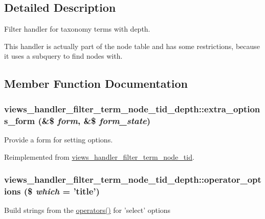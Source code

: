 \subsection{Detailed Description}
Filter handler for taxonomy terms with depth.

This handler is actually part of the node table and has some restrictions, because it uses a subquery to find nodes with. 

\subsection{Member Function Documentation}
\hypertarget{classviews__handler__filter__term__node__tid__depth_a704c5e42a5a41ee12bd01b1b153431e4}{
\subsubsection[{extra\_\-options\_\-form}]{\setlength{\rightskip}{0pt plus 5cm}views\_\-handler\_\-filter\_\-term\_\-node\_\-tid\_\-depth::extra\_\-options\_\-form (\&\$ {\em form}, \/  \&\$ {\em form\_\-state})}}
\label{classviews__handler__filter__term__node__tid__depth_a704c5e42a5a41ee12bd01b1b153431e4}
Provide a form for setting options. 

Reimplemented from \hyperlink{classviews__handler__filter__term__node__tid_adf599d1bef08003b1b734dfd397030a6}{views\_\-handler\_\-filter\_\-term\_\-node\_\-tid}.\hypertarget{classviews__handler__filter__term__node__tid__depth_aa96e237e053dea657d9c419aecea51c4}{
\subsubsection[{operator\_\-options}]{\setlength{\rightskip}{0pt plus 5cm}views\_\-handler\_\-filter\_\-term\_\-node\_\-tid\_\-depth::operator\_\-options (\$ {\em which} = {\ttfamily 'title'})}}
\label{classviews__handler__filter__term__node__tid__depth_aa96e237e053dea657d9c419aecea51c4}
Build strings from the \hyperlink{classviews__handler__filter__many__to__one_ae397d071d9f55b4053b88f01572e700f}{operators()} for 'select' options 

